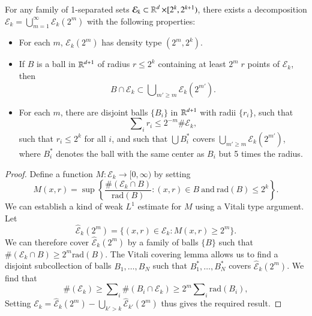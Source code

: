 %
%

\begin{lemma} \label{DecompositionTheorem}
    For any family of 1-separated sets $\mathcal{E}_k \subset \operatorname{\mathbb{R}}^d \times [2^k,2^{k+1})$, there exists a decomposition $\mathcal{E}_k = \bigcup_{m = 1}^\infty \mathcal{E}_k(2^m)$ with the following properties:
    \begin{itemize}[leftmargin=30pt]
        \item For each $m$, $\mathcal{E}_k(2^m)$ has density type $(2^m,2^k)$.

        \item If $B$ is a ball in $\operatorname{\mathbb{R}}^{d+1}$ of radius $r \leq 2^k$ containing at least $2^m\;\! r$ points of $\mathcal{E}_k$, then
        \[ B \cap \mathcal{E}_k \subset \bigcup\nolimits_{m' \geq m} \mathcal{E}_k(2^{m'}). \]

        \item For each $m$, there are disjoint balls $\{ B_i \}$ in $\operatorname{\mathbb{R}}^{d+1}$ with radii $\{ r_i \}$, such that
        \[ \sum\nolimits_i r_i \leq 2^{-m} \# \mathcal{E}_k, \]
        such that $r_i \leq 2^k$ for all $i$, and such that $\bigcup B_i^*$ covers $\bigcup_{m' \geq m} \mathcal{E}_k(2^{m'})$, where $B_i^*$ denotes the ball with the same center as $B_i$ but 5 times the radius.
    \end{itemize}
\end{lemma}
\begin{proof}
    Define a function $M: \mathcal{E}_k \to [0,\infty)$ by setting
    \begin{equation}
      M(x,r) = \sup \left\{ \frac{\#(\mathcal{E}_k \cap B)}{\text{rad}(B)} : (x,r) \in B\ \text{and}\ \text{rad}(B) \leq 2^k \right\}.
    \end{equation}
    We can establish a kind of weak $L^1$ estimate for $M$ using a Vitali type argument. Let
    \begin{equation}
      \widehat{\mathcal{E}}_k(2^m) = \{ (x,r) \in \mathcal{E}_k : M(x,r) \geq 2^m \}.
    \end{equation}
    We can therefore cover $\widehat{\mathcal{E}}_k(2^m)$ by a family of balls $\{ B \}$ such that $\#(\mathcal{E}_k \cap B) \geq 2^m \text{rad}(B)$. The Vitali covering lemma allows us to find a disjoint subcollection of balls $B_1,\dots,B_N$ such that $B_1^* ,\dots, B_N^*$ covers $\widehat{\mathcal{E}}_k(2^m)$. We find that
    \begin{equation}
      \#(\mathcal{E}_k) \geq \sum\nolimits_i \#(B_i \cap \mathcal{E}_k) \geq 2^m \sum\nolimits_i \text{rad}(B_i),
    \end{equation}
    Setting $\mathcal{E}_k = \widehat{\mathcal{E}}_k(2^m) - \bigcup_{k' > k} \widehat{\mathcal{E}}_{k'}(2^m)$ thus gives the required result.
\end{proof}

